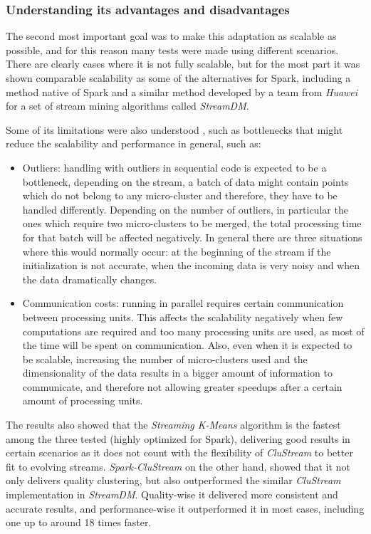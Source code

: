\documentclass[10pt, conference, compsocconf]{IEEEtran}
\begin{document}
\subsubsection{Understanding its advantages and disadvantages}

The second most important goal was to make this adaptation as scalable as possible, and for this reason many tests were made using different scenarios. There are clearly cases where it is not fully scalable, but for the most part it was shown comparable scalability as some of the alternatives for Spark, including a method native of Spark and a similar method developed by a team from \textit{Huawei} for a set of stream mining algorithms called \textit{StreamDM}.

Some of its limitations were also understood , such as bottlenecks that might reduce the scalability and performance in general, such as:

\begin{itemize}
 \item Outliers: handling with outliers in sequential code is expected to be a bottleneck, depending on the stream, a batch of data might contain points which do not belong to any micro-cluster and therefore, they have to be handled differently. Depending on the number of outliers, in particular the ones which require two micro-clusters to be merged, the total processing time for that batch will be affected negatively. In general there are three situations where this would normally occur: at the beginning of the stream if the initialization is not accurate, when the incoming data is very noisy and when the data dramatically changes.
 \item Communication costs: running in parallel requires certain communication between processing units. This affects the scalability negatively when few computations are required and too many processing units are used, as most of the time will be spent on communication. Also, even when it is expected to be scalable, increasing the number of micro-clusters used and the dimensionality of the data results in a bigger amount of information to communicate, and therefore not allowing greater speedups after a certain amount of processing units. 
\end{itemize}

The results also showed that the \textit{Streaming K-Means} algorithm is the fastest among the three tested (highly optimized for Spark), delivering good results in certain scenarios as it does not count with the flexibility of \textit{CluStream} to better fit to evolving streams. \textit{Spark-CluStream} on the other hand, showed that it not only delivers quality clustering, but also outperformed the similar \textit{CluStream} implementation in \textit{StreamDM}. Quality-wise it delivered more consistent and accurate results, and performance-wise it outperformed it in most cases, including one up to around 18 times faster. 
\end{document}
